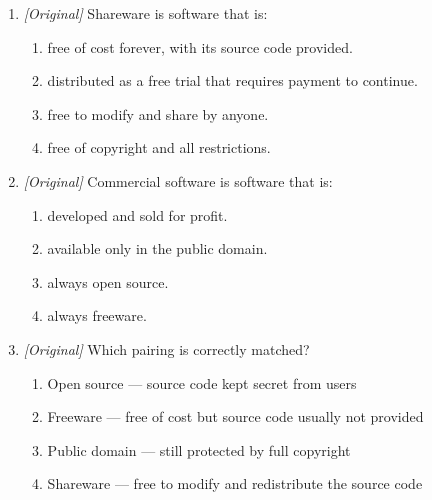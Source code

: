 \documentclass[11pt]{article}
\begin{document}
\begin{enumerate}[label=\textbf{Q\arabic*.}, leftmargin=*]
\begin{enumerate}[label=\Alph*.]
    \item GNU General Public License
    \item MIT License
    \item GNU AGPL
    \item None of these
  \end{enumerate}
\item \textit{[Original]} Shareware is software that is:
  \begin{enumerate}[label=\Alph*.]
    \item free of cost forever, with its source code provided.
    \item distributed as a free trial that requires payment to continue.
    \item free to modify and share by anyone.
    \item free of copyright and all restrictions.
  \end{enumerate}
\item \textit{[Original]} Commercial software is software that is:
  \begin{enumerate}[label=\Alph*.]
    \item developed and sold for profit.
    \item available only in the public domain.
    \item always open source.
    \item always freeware.
  \end{enumerate}
\item \textit{[Original]} Which pairing is correctly matched?
  \begin{enumerate}[label=\Alph*.]
    \item Open source --- source code kept secret from users
    \item Freeware --- free of cost but source code usually not provided
    \item Public domain --- still protected by full copyright
    \item Shareware --- free to modify and redistribute the source code
  \end{enumerate}


\end{enumerate}
\end{document}
